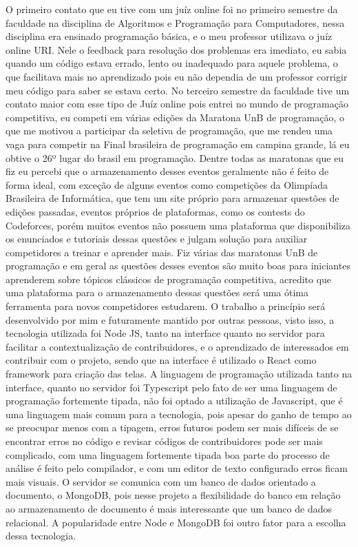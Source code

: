 O primeiro contato que eu tive com um juíz online foi no primeiro semestre da faculdade na disciplina de Algoritmos e Programação para Computadores, nessa disciplina era ensinado programação básica, e o meu professor utilizava o juíz online URI. Nele o feedback para resolução dos problemas era imediato, eu sabia quando um código estava errado, lento ou inadequado para aquele problema, o que facilitava mais no aprendizado pois eu não dependia de um professor corrigir meu código para saber se estava certo. No terceiro semestre da faculdade tive um contato maior com esse tipo de Juíz online pois entrei no mundo de programação competitiva, eu competi em várias edições da Maratona UnB de programação, o que me motivou a participar da seletiva de programação, que me rendeu uma vaga para competir na Final brasileira de programação em campina grande, lá eu obtive o 26º lugar do brasil em programação. Dentre todas as maratonas que eu fiz eu percebi que o armazenamento desses eventos geralmente não é feito de forma ideal, com exceção de alguns eventos como competições da Olimpíada Brasileira de Informática, que tem um site próprio para armazenar questões de edições passadas, eventos próprios de plataformas, como os contests do Codeforces, porém muitos eventos não possuem uma plataforma que disponibiliza os enunciados e tutoriais dessas questões e julgam solução para auxiliar competidores a treinar e aprender mais. Fiz várias das maratonas UnB de programação e em geral as questões desses eventos são muito boas para iniciantes aprenderem sobre tópicos clássicos de programação competitiva, acredito que uma plataforma para o armazenamento dessas questões será uma ótima ferramenta para novos competidores estudarem.
O trabalho a princípio será desenvolvido por mim e futuramente mantido por outras pessoas, visto isso, a tecnologia utilizada foi Node JS, tanto na interface quanto no servidor para facilitar a contextualização de contribuidores, e o aprendizado de interessados em contribuir com o projeto, sendo que na interface é utilizado o React como framework para criação das telas. A linguagem de programação utilizada tanto na interface, quanto no servidor foi Typescript pelo fato de ser uma linguagem de programação fortemente tipada, não foi optado a utilização de Javascript, que é uma linguagem mais comum para a tecnologia, pois apesar do ganho de tempo ao se preocupar menos com a tipagem, erros futuros podem ser mais difíceis de se encontrar erros no código e revisar códigos de contribuidores pode ser mais complicado, com uma linguagem fortemente tipada boa parte do processo de análise é feito pelo compilador, e com um editor de texto configurado erros ficam mais visuais. O servidor se comunica com um banco de dados orientado a documento, o MongoDB, pois nesse projeto a flexibilidade do banco em relação ao armazenamento de documento é mais interessante que um banco de dados relacional. A popularidade entre Node e MongoDB foi outro fator para a escolha dessa tecnologia. 
	

